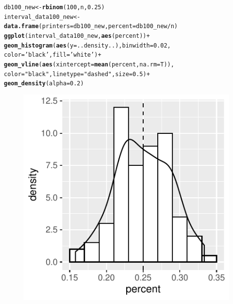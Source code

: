 \documentclass[10pt]{report}\usepackage[]{graphicx}\usepackage[]{xcolor}
\makeatletter
\def\maxwidth{ %
  \ifdim\Gin@nat@width>\linewidth
    \linewidth
  \else
    \Gin@nat@width
  \fi
}
\newcommand{\hlnum}[1]{\textcolor[rgb]{0.686,0.059,0.569}{#1}}%
\newcommand{\hlstr}[1]{\textcolor[rgb]{0.192,0.494,0.8}{#1}}%
\newcommand{\hlopt}[1]{\textcolor[rgb]{0,0,0}{#1}}%
\newcommand{\hlstd}[1]{\textcolor[rgb]{0.345,0.345,0.345}{#1}}%
\newcommand{\hlkwb}[1]{\textcolor[rgb]{0.69,0.353,0.396}{#1}}%
\newcommand{\hlkwc}[1]{\textcolor[rgb]{0.333,0.667,0.333}{#1}}%
\newcommand{\hlkwd}[1]{\textcolor[rgb]{0.737,0.353,0.396}{\textbf{#1}}}%
\newenvironment{kframe}{%
 \def\at@end@of@kframe{}%
 \ifinner\ifhmode%
  \def\at@end@of@kframe{\end{minipage}}%
  \begin{minipage}{\columnwidth}%
 \fi\fi%
 \def\FrameCommand##1{\hskip\@totalleftmargin \hskip-\fboxsep
 \colorbox{shadecolor}{##1}\hskip-\fboxsep
     \hskip-\linewidth \hskip-\@totalleftmargin \hskip\columnwidth}%
 \MakeFramed {\advance\hsize-\width
   \@totalleftmargin\z@ \linewidth\hsize
   \@setminipage}}%
 {\par\unskip\endMakeFramed%
 \at@end@of@kframe}
\newenvironment{knitrout}{}{} %
\makeatother
\begin{document}
\begin{easylist}[enumerate]
\begin{knitrout}
\color{fgcolor}\begin{kframe}
\begin{alltt}
         \hlstd{db100_new} \hlkwb{<-} \hlkwd{rbinom}\hlstd{(}\hlnum{100}\hlstd{, n,} \hlnum{0.25}\hlstd{)}
         \hlstd{interval_data100_new} \hlkwb{<-} \hlkwd{data.frame}\hlstd{(}\hlkwc{printers}\hlstd{=db100_new,} \hlkwc{percent}\hlstd{=db100_new}\hlopt{/}\hlstd{n)}
         \hlkwd{ggplot}\hlstd{(interval_data100_new,} \hlkwd{aes}\hlstd{(percent))} \hlopt{+}
                    \hlkwd{geom_histogram}\hlstd{(}\hlkwd{aes}\hlstd{(}\hlkwc{y}\hlstd{=..density..),} \hlkwc{binwidth}\hlstd{=}\hlnum{0.02}\hlstd{,}
                                   \hlkwc{color}\hlstd{=}\hlstr{'black'}\hlstd{,} \hlkwc{fill}\hlstd{=}\hlstr{'white'}\hlstd{)} \hlopt{+}
                    \hlkwd{geom_vline}\hlstd{(}\hlkwd{aes}\hlstd{(}\hlkwc{xintercept}\hlstd{=}\hlkwd{mean}\hlstd{(percent,} \hlkwc{na.rm}\hlstd{=T)),}
                               \hlkwc{color}\hlstd{=}\hlstr{"black"}\hlstd{,} \hlkwc{linetype}\hlstd{=}\hlstr{"dashed"}\hlstd{,} \hlkwc{size}\hlstd{=}\hlnum{0.5}\hlstd{)} \hlopt{+}
                    \hlkwd{geom_density}\hlstd{(}\hlkwc{alpha}\hlstd{=}\hlnum{0.2}\hlstd{)}
\end{alltt}
\end{kframe}\begin{figure}[H]

{\centering \includegraphics[width=\maxwidth]{figure/interval_data_new-1} 

}
\end{figure}
\end{knitrout}
\end{easylist}
\end{document}
